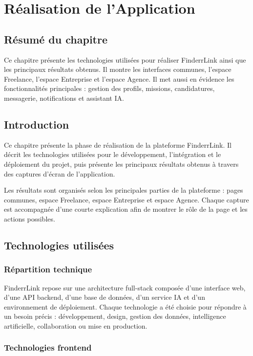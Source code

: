 \chapter{Réalisation de l'Application}
\section*{Résumé du chapitre}

Ce chapitre présente les technologies utilisées pour réaliser FinderrLink ainsi que les principaux résultats obtenus. Il montre les interfaces communes, l'espace Freelance, l'espace Entreprise et l'espace Agence. Il met aussi en évidence les fonctionnalités principales : gestion des profils, missions, candidatures, messagerie, notifications et assistant IA.

\section{Introduction}

Ce chapitre présente la phase de réalisation de la plateforme FinderrLink. Il décrit les technologies utilisées pour le développement, l'intégration et le déploiement du projet, puis présente les principaux résultats obtenus à travers des captures d'écran de l'application.

Les résultats sont organisés selon les principales parties de la plateforme : pages communes, espace Freelance, espace Entreprise et espace Agence. Chaque capture est accompagnée d'une courte explication afin de montrer le rôle de la page et les actions possibles.

\section{Technologies utilisées}

\subsection{Répartition technique}

FinderrLink repose sur une architecture full-stack composée d'une interface web, d'une API backend, d'une base de données, d'un service IA et d'un environnement de déploiement. Chaque technologie a été choisie pour répondre à un besoin précis : développement, design, gestion des données, intelligence artificielle, collaboration ou mise en production.

\subsection{Technologies frontend}


